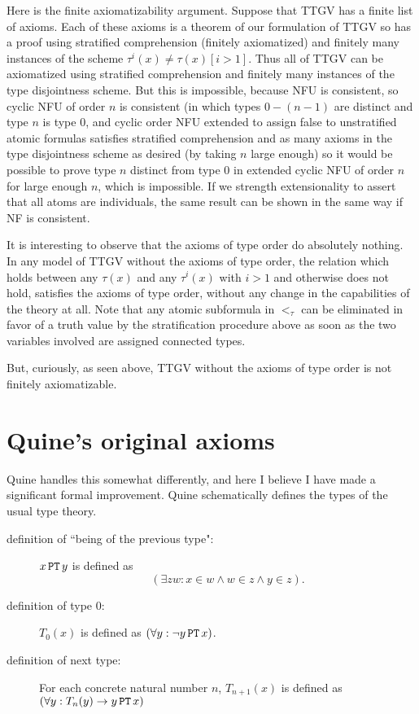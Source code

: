 \documentclass[12pt]{article}
\begin{document}
Here is the finite axiomatizability argument.  Suppose that TTGV has a finite list of axioms.  Each of these axioms is a theorem of our formulation of TTGV so has a proof using stratified comprehension (finitely axiomatized) and finitely many instances of the scheme $\tau^{i}(x) \neq \tau(x) [i>1]$.  Thus all of TTGV can be axiomatized
using stratified comprehension and finitely many instances of the type disjointness scheme.  But this is impossible, because NFU is consistent, so cyclic NFU of order $n$ is consistent (in which types $0-(n-1)$ are distinct and type $n$ is type 0, and cyclic order NFU extended to assign false to unstratified atomic formulas satisfies
stratified comprehension and as many axioms in the type disjointness scheme as desired (by taking $n$ large enough) so it would be possible to prove type $n$ distinct from type 0 in extended cyclic NFU of order $n$ for large enough $n$, which is impossible.  If we strength extensionality to assert that all atoms are individuals, the same result can be shown in the same way if NF is consistent.

It is interesting to observe that the axioms of type order do absolutely nothing.  In any model of TTGV without the axioms of type order, the relation which holds between any $\tau(x)$ and any $\tau^i(x)$ with $i>1$ and otherwise does not hold, satisfies the axioms of type order, without any change in 
the capabilities of the theory at all.  Note that any atomic subformula in $<_\tau$ can be eliminated in favor of a truth value by the stratification procedure above as soon as the two variables involved are assigned connected types.

But, curiously, as seen above, TTGV without the axioms of type order is not finitely axiomatizable.





\section{Quine's original axioms}

Quine handles this somewhat differently, and here I believe I have made a significant formal improvement.  Quine schematically defines the types of the usual type theory.


\begin{description}

\item[definition of ``being of the previous type":]  $x\, {\tt PT}\, y$ is defined as $$(\exists zw: x \in w \wedge w \in z \wedge y \in z).$$

\item[definition of type 0:]  $T_0(x)$ is defined as $(\forall y: \neg y\, {\tt PT}\, x)$.

\item[definition of next type:]  For each concrete natural number $n$, $T_{n+1}(x)$ is
defined as $(\forall y:  T_n(y) \rightarrow y\, {\tt PT}\, x)$

\end{description}
\end{document}
